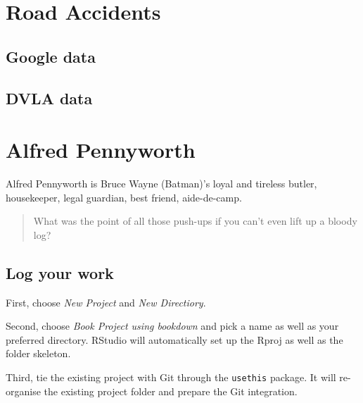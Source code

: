 \documentclass[]{book}
\begin{document}
\hypertarget{road-accidents}{%
\chapter{Road Accidents}\label{road-accidents}}

\hypertarget{google-data}{%
\section{Google data}\label{google-data}}

\hypertarget{dvla-data}{%
\section{DVLA data}\label{dvla-data}}

\hypertarget{alfred-pennyworth}{%
\chapter{Alfred Pennyworth}\label{alfred-pennyworth}}

Alfred Pennyworth is Bruce Wayne (Batman)'s loyal and tireless butler, housekeeper, legal guardian, best friend, aide-de-camp.

\begin{quote}
What was the point of all those push-ups if you can't even lift up a bloody log?
\end{quote}

\hypertarget{log-your-work}{%
\section{Log your work}\label{log-your-work}}

First, choose \emph{New Project} and \emph{New Directiory}.

Second, choose \emph{Book Project using bookdown} and pick a name as well as your preferred directory. RStudio will automatically set up the Rproj as well as the folder skeleton.

Third, tie the existing project with Git through the \texttt{usethis} package. It will re-organise the existing project folder and prepare the Git integration.
\end{document}
